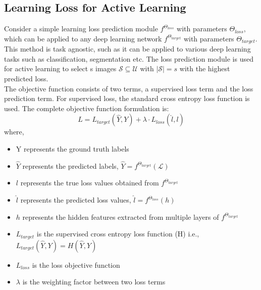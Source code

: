 \subsection{Learning Loss for Active Learning}
Consider a simple learning loss prediction module \cite{yoo2019} $f^{\Theta_{loss}}$ with parameters $\Theta_{loss}$, which can be applied to any deep learning network $f^{\Theta_{target}}$ with parameters $\Theta_{target}$. This method is task agnostic, such as it can be applied to various deep learning tasks such as classification, segmentation etc. The loss prediction module is used for active learning to select s images $\mathcal{S} \subseteq \mathcal{U}$ with $|\mathcal{S}| = s$ with the highest predicted loss. \\
The objective function consists of two terms, a supervised loss term and the loss prediction term. For supervised loss, the standard cross entropy loss function \cite{cox1958} is used. The complete objective function formulation is:
\begin{equation}
    \label{equation:learning_loss_full_loss}
    L = L_{target}(\hat{Y}, Y) + \lambda \cdot L_{loss}(\hat{l}, l)
\end{equation}
where,
\begin{itemize}[label={}]
  \setlength\itemsep{0em}
  \item Y represents the ground truth labels
  \item $\hat{Y}$ represents the predicted labels, $\hat{Y} = f^{\Theta_{target}}(\mathcal{L})$
  \item $l$ represents the true loss values obtained from $f^{\Theta_{target}}$
  \item $\hat{l}$ represents the predicted loss values, $\hat{l} = f^{\Theta_{loss}}(h)$
  \item $h$ represents the hidden features extracted from multiple layers of $f^{\Theta_{target}}$
  \item $L_{target}$ is the supervised cross entropy loss function (H) i.e., $L_{target}(\hat{Y}, Y) = H(\hat{Y}, Y)$
  \item $L_{loss}$ is the loss objective function
  \item $\lambda$ is the weighting factor between two loss terms
\end{itemize}

